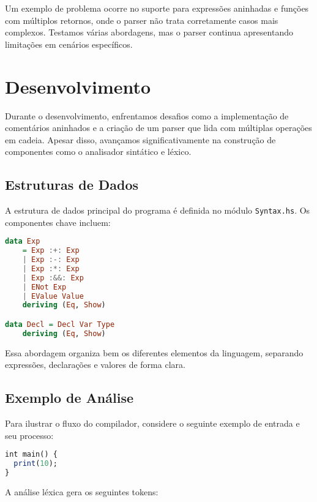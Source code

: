 \documentclass[a4paper,12pt]{article}
\begin{document}
Um exemplo de problema ocorre no suporte para expressões aninhadas e funções com múltiplos retornos, onde o parser não trata corretamente casos mais complexos. Testamos várias abordagens, mas o parser continua apresentando limitações em cenários específicos.

\section{Desenvolvimento}

Durante o desenvolvimento, enfrentamos desafios como a implementação de comentários aninhados e a criação de um parser que lida com múltiplas operações em cadeia. Apesar disso, avançamos significativamente na construção de componentes como o analisador sintático e léxico.

\subsection{Estruturas de Dados}

A estrutura de dados principal do programa é definida no módulo \texttt{Syntax.hs}. Os componentes chave incluem:

\begin{lstlisting}[language=Haskell, caption={Definição de Expressões e Declarações}]
data Exp
    = Exp :+: Exp              
    | Exp :-: Exp              
    | Exp :*: Exp              
    | Exp :&&: Exp             
    | ENot Exp
    | EValue Value
    deriving (Eq, Show)

data Decl = Decl Var Type
    deriving (Eq, Show)
\end{lstlisting}

Essa abordagem organiza bem os diferentes elementos da linguagem, separando expressões, declarações e valores de forma clara.

\subsection{Exemplo de Análise}

Para ilustrar o fluxo do compilador, considere o seguinte exemplo de entrada e seu processo:

\begin{lstlisting}[language=Haskell, caption={Exemplo de código de entrada}]
int main() {
  print(10);
}
\end{lstlisting}

A análise léxica gera os seguintes tokens:
\end{document}
